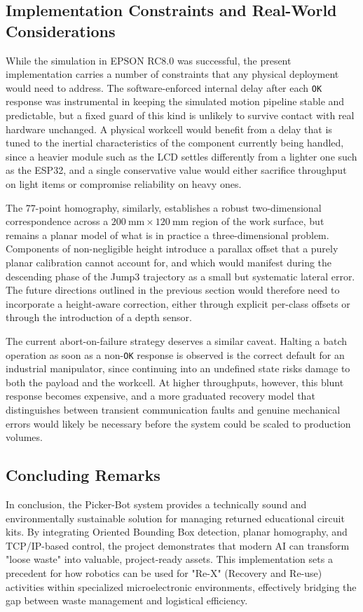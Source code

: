 \documentclass[conference]{IEEEtran}
\begin{document}
\subsection{Implementation Constraints and Real-World Considerations}
While the simulation in EPSON RC8.0 was successful, the present implementation carries a number of constraints that any physical deployment would need to address. The software-enforced internal delay after each \texttt{OK} response was instrumental in keeping the simulated motion pipeline stable and predictable, but a fixed guard of this kind is unlikely to survive contact with real hardware unchanged. A physical workcell would benefit from a delay that is tuned to the inertial characteristics of the component currently being handled, since a heavier module such as the LCD settles differently from a lighter one such as the ESP32, and a single conservative value would either sacrifice throughput on light items or compromise reliability on heavy ones.

The 77-point homography, similarly, establishes a robust two-dimensional correspondence across a $200~\text{mm} \times 120~\text{mm}$ region of the work surface, but remains a planar model of what is in practice a three-dimensional problem. Components of non-negligible height introduce a parallax offset that a purely planar calibration cannot account for, and which would manifest during the descending phase of the Jump3 trajectory as a small but systematic lateral error. The future directions outlined in the previous section would therefore need to incorporate a height-aware correction, either through explicit per-class offsets or through the introduction of a depth sensor.

The current abort-on-failure strategy deserves a similar caveat. Halting a batch operation as soon as a non-\texttt{OK} response is observed is the correct default for an industrial manipulator, since continuing into an undefined state risks damage to both the payload and the workcell. At higher throughputs, however, this blunt response becomes expensive, and a more graduated recovery model that distinguishes between transient communication faults and genuine mechanical errors would likely be necessary before the system could be scaled to production volumes.
\subsection{Concluding Remarks}
In conclusion, the Picker-Bot system provides a technically sound and environmentally sustainable solution for managing returned educational circuit kits. By integrating Oriented Bounding Box detection, planar homography, and TCP/IP-based control, the project demonstrates that modern AI can transform "loose waste" into valuable, project-ready assets. This implementation sets a precedent for how robotics can be used for "Re-X" (Recovery and Re-use) activities within specialized microelectronic environments, effectively bridging the gap between waste management and logistical efficiency.
\end{document}
